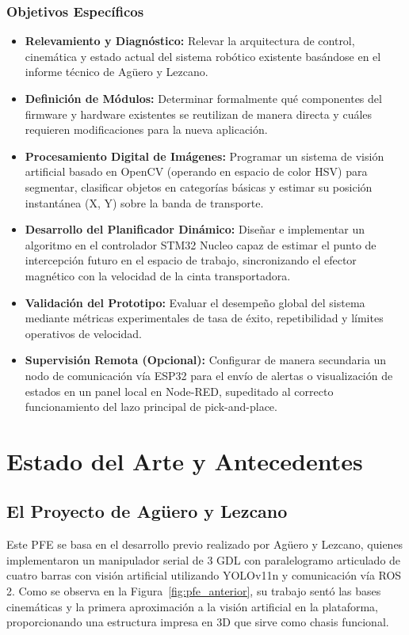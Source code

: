 \documentclass[12pt, a4paper]{report}
\begin{document}
\subsection{Objetivos Específicos}
\begin{itemize}
    \item \textbf{Relevamiento y Diagnóstico:} Relevar la arquitectura de control, cinemática y estado actual del sistema robótico existente basándose en el informe técnico de Agüero y Lezcano.
    \item \textbf{Definición de Módulos:} Determinar formalmente qué componentes del firmware y hardware existentes se reutilizan de manera directa y cuáles requieren modificaciones para la nueva aplicación.
    \item \textbf{Procesamiento Digital de Imágenes:} Programar un sistema de visión artificial basado en OpenCV (operando en espacio de color HSV) para segmentar, clasificar objetos en categorías básicas y estimar su posición instantánea (X, Y) sobre la banda de transporte.
    \item \textbf{Desarrollo del Planificador Dinámico:} Diseñar e implementar un algoritmo en el controlador STM32 Nucleo capaz de estimar el punto de intercepción futuro en el espacio de trabajo, sincronizando el efector magnético con la velocidad de la cinta transportadora.
    \item \textbf{Validación del Prototipo:} Evaluar el desempeño global del sistema mediante métricas experimentales de tasa de éxito, repetibilidad y límites operativos de velocidad.
    \item \textbf{Supervisión Remota (Opcional):} Configurar de manera secundaria un nodo de comunicación vía ESP32 para el envío de alertas o visualización de estados en un panel local en Node-RED, supeditado al correcto funcionamiento del lazo principal de pick-and-place.
\end{itemize}

\chapter{Estado del Arte y Antecedentes}
\section{El Proyecto de Agüero y Lezcano}
Este PFE se basa en el desarrollo previo realizado por Agüero y Lezcano, quienes implementaron un manipulador serial de 3 GDL con paralelogramo articulado de cuatro barras con visión artificial utilizando YOLOv11n y comunicación vía ROS 2. Como se observa en la Figura~\ref{fig:pfe_anterior}, su trabajo sentó las bases cinemáticas y la primera aproximación a la visión artificial en la plataforma, proporcionando una estructura impresa en 3D que sirve como chasis funcional.
\end{document}
